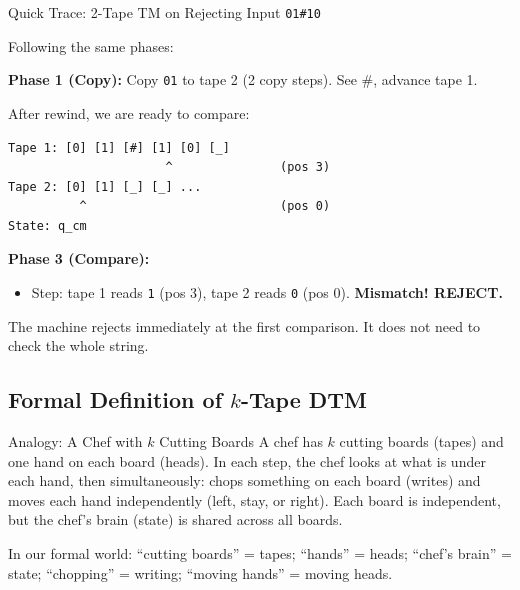 \documentclass[11pt,a4paper]{article}
\begin{document}
\begin{examplebox}{Quick Trace: 2-Tape TM on Rejecting Input \texttt{01\#10}}

Following the same phases:

\textbf{Phase 1 (Copy):} Copy \texttt{01} to tape 2 (2 copy steps). See \#, advance tape 1.

After rewind, we are ready to compare:
\begin{lstlisting}
Tape 1: [0] [1] [#] [1] [0] [_]
                      ^               (pos 3)
Tape 2: [0] [1] [_] [_] ...
          ^                           (pos 0)
State: q_cm
\end{lstlisting}

\textbf{Phase 3 (Compare):}
\begin{itemize}[nosep]
\item Step: tape 1 reads \texttt{1} (pos 3), tape 2 reads \texttt{0} (pos 0). \textbf{Mismatch! REJECT.}
\end{itemize}

The machine rejects immediately at the first comparison. It does not need to check the whole string.
\end{examplebox}

\subsection{Formal Definition of $k$-Tape DTM}

\begin{notebox}{Analogy: A Chef with $k$ Cutting Boards}
A chef has $k$ cutting boards (tapes) and one hand on each board (heads). In each step, the chef looks at what is under each hand, then simultaneously: chops something on each board (writes) and moves each hand independently (left, stay, or right). Each board is independent, but the chef's brain (state) is shared across all boards.

In our formal world: ``cutting boards'' = tapes; ``hands'' = heads; ``chef's brain'' = state; ``chopping'' = writing; ``moving hands'' = moving heads.
\end{notebox}
\end{document}
